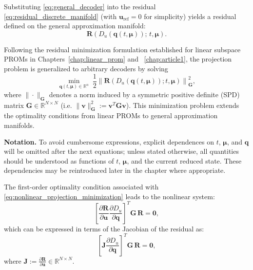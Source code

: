 Substituting \eqref{eq:general_decoder} into the residual \eqref{eq:residual_discrete_manifold} (with $\mathbf{u}_{\text{ref}}=0$ for simplicity) yields a residual defined on the general approximation manifold:
\begin{equation}
\mathbf{R}(D_u(\mathbf{q}(t, \boldsymbol{\mu}));\,t,\boldsymbol{\mu}).
\end{equation}



Following the residual minimization formulation established for linear subspace PROMs in Chapters~\ref{chap:linear_prom} and ~\ref{chap:article1}, the projection problem is generalized to arbitrary decoders by solving
\begin{equation}
\min_{\mathbf{q}(t, \boldsymbol{\mu}) \in \mathbb{R}^{n}} 
\; \frac{1}{2} \left\lVert 
\mathbf{R}(D_u(\mathbf{q}(t, \boldsymbol{\mu})); t, \boldsymbol{\mu}) 
\right\rVert_{\mathbf{G}}^2,
\label{eq:nonlinear_projection_minimization}
\end{equation}
where \( \|\cdot\|_{\mathbf{G}} \) denotes a norm induced by a symmetric positive definite (SPD) matrix \( \mathbf{G} \in \mathbb{R}^{N \times N} \) (i.e. \( \|\mathbf{v}\|_{\mathbf{G}}^{2} := \mathbf{v}^{T}\mathbf{G}\mathbf{v} \)). This minimization problem extends the optimality conditions from linear PROMs to general approximation manifolds.

\textbf{Notation.} To avoid cumbersome expressions, explicit dependences on \(t\), \(\boldsymbol{\mu}\), and \(\mathbf{q}\) will be omitted after the next equations; unless stated otherwise, all quantities should be understood as functions of \(t\), \(\boldsymbol{\mu}\), and the current reduced state. These dependencies may be reintroduced later in the chapter where appropriate.

The first-order optimality condition associated with \eqref{eq:nonlinear_projection_minimization} leads to the nonlinear system:
\begin{equation}
\left[
\frac{\partial \mathbf{R}}{\partial \mathbf{u}} 
\frac{\partial D_u}{\partial \mathbf{q}}
\right]^T
\mathbf{G} \, 
\mathbf{R} = \mathbf{0},
\end{equation}
which can be expressed in terms of the Jacobian of the residual as:
\begin{equation}
\left[
\mathbf{J} 
\frac{\partial D_u}{\partial \mathbf{q}}
\right]^T
\mathbf{G} \, 
\mathbf{R} = \mathbf{0},
\end{equation}
where \( \mathbf{J} := \tfrac{\partial \mathbf{R}}{\partial \mathbf{u}} \in \mathbb{R}^{N \times N} \).


